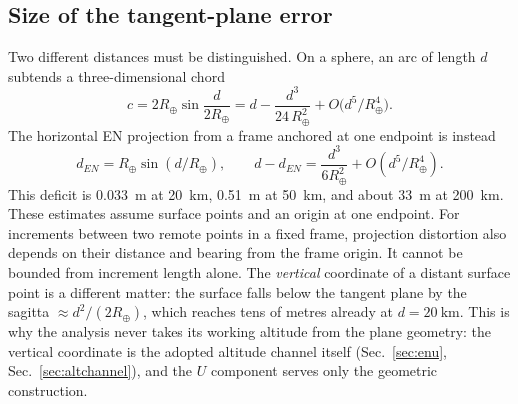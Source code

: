 \begin{revblock}
\section{Size of the tangent-plane error}
\label{app:geodesy-error}

Two different distances must be distinguished. On a sphere, an arc of length $d$
subtends a three-dimensional chord
\begin{equation}
c=2R_\oplus\sin\!\frac{d}{2R_\oplus}
 = d-\frac{d^{3}}{24\,R_\oplus^{2}}+O\!\big(d^{5}/R_\oplus^4\big).
\end{equation}
The horizontal EN projection from a frame anchored at one endpoint is instead
\begin{equation}
 d_{EN}=R_\oplus\sin(d/R_\oplus),\qquad
 d-d_{EN}=\frac{d^3}{6R_\oplus^2}+O(d^5/R_\oplus^4).
\end{equation}
This deficit is \SI{0.033}{\metre} at \SI{20}{\kilo\metre},
\SI{0.51}{\metre} at \SI{50}{\kilo\metre}, and about
\SI{33}{\metre} at \SI{200}{\kilo\metre}. These estimates assume surface points
and an origin at one endpoint. For increments between two remote points in a
fixed frame, projection distortion also depends on their distance and bearing
from the frame origin. It cannot be bounded from increment length alone. The
\emph{vertical} coordinate of a distant surface point is a different matter: the surface
falls below the tangent plane by the sagitta $\approx d^{2}/(2R_\oplus)$, which reaches
tens of metres already at $d=\SI{20}{\kilo\metre}$. This is why the analysis never takes
its working altitude from the plane geometry: the vertical coordinate is the adopted
altitude channel itself (Sec.~\ref{sec:enu}, Sec.~\ref{sec:altchannel}), and the $U$
component serves only the geometric construction.
\end{revblock}

